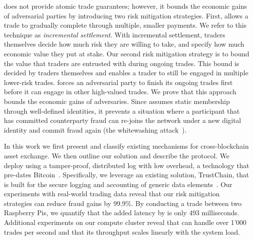 \ModelName{} does not provide atomic trade guarantees; however, it bounds the economic gains of adversarial parties by introducing two risk mitigation strategies.
First, \ModelName{} allows a trade to gradually complete through multiple, smaller payments.
We refer to this technique as \emph{incremental settlement}.
With incremental settlement, traders themselves decide how much risk they are willing to take, and specify how much economic value they put at stake.
Our second risk mitigation strategy is to bound the value that traders are entrusted with during ongoing trades.
This bound is decided by traders themselves and enables a trader to still be engaged in multiple lower-risk trades.
\ModelName{} forces an adversarial party to finish its ongoing trades first before it can engage in other high-valued trades.
We prove that this approach bounds the economic gains of adversaries.
Since \ModelName{} assumes static membership through well-defined identities, it prevents a situation where a participant that has committed counterparty fraud can re-joins the network under a new digital identity and commit fraud again (the whitewashing attack~\cite{feldman2006free}).

In this work we first present and classify existing mechanisms for cross-blockchain asset exchange.
We then outline our solution and describe the \ModelName{} protocol.
We deploy \ModelName{} using a tamper-proof, distributed log with low overhead, a technology that pre-dates Bitcoin~\cite{haeberlen2007peerreview}.
Specifically, we leverage an existing solution, TrustChain, that is built for the secure logging and accounting of generic data elements~\cite{otte2017trustchain}.
Our experiments with real-world trading data reveal that our risk mitigation strategies can reduce fraud gains by 99.9\%.
By conducting a trade between two Raspberry Pis, we quantify that the added latency by \ModelName{} is only 493 milliseconds.
Additional experiments on our compute cluster reveal that \ModelName{} can handle over 1'000 trades per second and that its throughput scales linearly with the system load.

